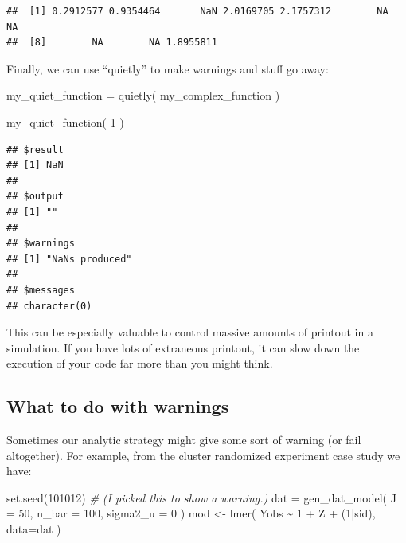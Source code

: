\documentclass[
]{book}
\newenvironment{Shaded}{\begin{snugshade}}{\end{snugshade}}
\newcommand{\AttributeTok}[1]{\textcolor[rgb]{0.77,0.63,0.00}{#1}}
\newcommand{\CommentTok}[1]{\textcolor[rgb]{0.56,0.35,0.01}{\textit{#1}}}
\newcommand{\DecValTok}[1]{\textcolor[rgb]{0.00,0.00,0.81}{#1}}
\newcommand{\FunctionTok}[1]{\textcolor[rgb]{0.00,0.00,0.00}{#1}}
\newcommand{\NormalTok}[1]{#1}
\newcommand{\OtherTok}[1]{\textcolor[rgb]{0.56,0.35,0.01}{#1}}
\newcommand{\SpecialCharTok}[1]{\textcolor[rgb]{0.00,0.00,0.00}{#1}}
\begin{document}
\begin{verbatim}
##  [1] 0.2912577 0.9354464       NaN 2.0169705 2.1757312        NA        NA
##  [8]        NA        NA 1.8955811
\end{verbatim}

Finally, we can use ``quietly'' to make warnings and stuff go away:

\begin{Shaded}
\begin{Highlighting}[]
\NormalTok{my\_quiet\_function }\OtherTok{=} \FunctionTok{quietly}\NormalTok{( my\_complex\_function )}

\FunctionTok{my\_quiet\_function}\NormalTok{( }\DecValTok{1}\NormalTok{ )}
\end{Highlighting}
\end{Shaded}

\begin{verbatim}
## $result
## [1] NaN
## 
## $output
## [1] ""
## 
## $warnings
## [1] "NaNs produced"
## 
## $messages
## character(0)
\end{verbatim}

This can be especially valuable to control massive amounts of printout in a simulation. If you have lots of extraneous printout, it can slow down the execution of your code far more than you might think.

\hypertarget{what-to-do-with-warnings}{%
\subsection{What to do with warnings}\label{what-to-do-with-warnings}}

Sometimes our analytic strategy might give some sort of warning (or fail altogether).
For example, from the cluster randomized experiment case study we have:

\begin{Shaded}
\begin{Highlighting}[]
\FunctionTok{set.seed}\NormalTok{(}\DecValTok{101012}\NormalTok{)  }\CommentTok{\# (I picked this to show a warning.)}
\NormalTok{dat }\OtherTok{=} \FunctionTok{gen\_dat\_model}\NormalTok{( }\AttributeTok{J =} \DecValTok{50}\NormalTok{, }\AttributeTok{n\_bar =} \DecValTok{100}\NormalTok{, }\AttributeTok{sigma2\_u =} \DecValTok{0}\NormalTok{ )}
\NormalTok{mod }\OtherTok{\textless{}{-}} \FunctionTok{lmer}\NormalTok{( Yobs }\SpecialCharTok{\textasciitilde{}} \DecValTok{1} \SpecialCharTok{+}\NormalTok{ Z }\SpecialCharTok{+}\NormalTok{ (}\DecValTok{1}\SpecialCharTok{|}\NormalTok{sid), }\AttributeTok{data=}\NormalTok{dat )}
\end{Highlighting}
\end{Shaded}
\end{document}
